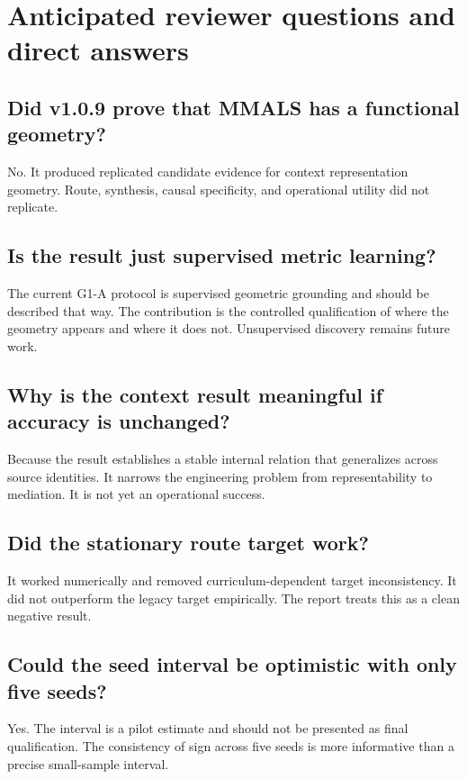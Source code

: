 \documentclass[11pt,a4paper]{article}
\begin{document}
\section{Anticipated reviewer questions and direct answers}

\subsection*{Did v1.0.9 prove that MMALS has a functional geometry?}

No. It produced replicated candidate evidence for context representation geometry. Route, synthesis, causal specificity, and operational utility did not replicate.

\subsection*{Is the result just supervised metric learning?}

The current G1-A protocol is supervised geometric grounding and should be described that way. The contribution is the controlled qualification of where the geometry appears and where it does not. Unsupervised discovery remains future work.

\subsection*{Why is the context result meaningful if accuracy is unchanged?}

Because the result establishes a stable internal relation that generalizes across source identities. It narrows the engineering problem from representability to mediation. It is not yet an operational success.

\subsection*{Did the stationary route target work?}

It worked numerically and removed curriculum-dependent target inconsistency. It did not outperform the legacy target empirically. The report treats this as a clean negative result.

\subsection*{Could the seed interval be optimistic with only five seeds?}

Yes. The interval is a pilot estimate and should not be presented as final qualification. The consistency of sign across five seeds is more informative than a precise small-sample interval.
\end{document}
